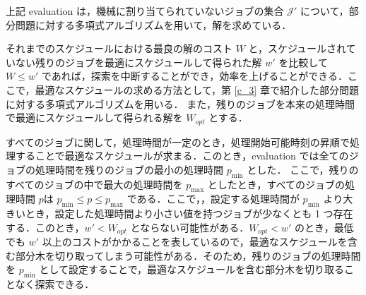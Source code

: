 \documentclass[12pt]{optlab-bachelor}
\begin{document}
上記 {\sc evaluation} は，機械に割り当てられていないジョブの集合 $\mathcal{J}'$ について，部分問題に対する多項式アルゴリズムを用いて，解を求めている．

それまでのスケジュールにおける最良の解のコスト $W$ と，スケジュールされていない残りのジョブを最適にスケジュールして得られた解 $w'$ を比較して $W \le w'$ であれば，探索を中断することができ，効率を上げることができる．ここで，最適なスケジュールの求める方法として，第 \ref{c_3} 章で紹介した部分問題に対する多項式アルゴリズムを用いる．
また，残りのジョブを本来の処理時間で最適にスケジュールして得られる解を $W_{opt}$ とする．

すべてのジョブに関して，処理時間が一定のとき，処理開始可能時刻の昇順で処理することで最適なスケジュールが求まる．このとき，{\sc evaluation} では全てのジョブの処理時間を残りのジョブの最小の処理時間 $p_{\min}$ とした．
ここで，残りのすべてのジョブの中で最大の処理時間を $p_{\max}$ としたとき，すべてのジョブの処理時間 $p$は $p_{\min} \le p \le p_{\max}$ である．ここで，，設定する処理時間が $p_{\min}$ より大きいとき，設定した処理時間より小さい値を持つジョブが少なくとも 1 つ存在する．このとき，$w' < W_{opt}$ とならない可能性がある．$W_{opt} < w'$ のとき，最低でも $w'$ 以上のコストがかかることを表しているので，最適なスケジュールを含む部分木を切り取ってしまう可能性がある．そのため，残りのジョブの処理時間を $p_{\min}$ として設定することで，最適なスケジュールを含む部分木を切り取ることなく探索できる．
\end{document}
